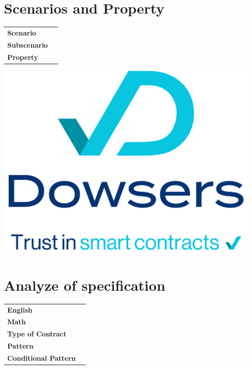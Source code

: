 \documentclass[a4paper,10pt]{article}
\newcommand{\pattern}{}
\newcommand{\conditionalPattern}{}
\newcommand{\specificationEN}{}
\newcommand{\specificationMATH}{}
\newcommand{\contractType}{}
\newcommand{\scenario}{}
\newcommand{\subScenario}{}
\newcommand{\property}{}
\begin{document}
\section{Scenarios and Property}
\begin{tabular}{p{} p{}}
\textbf{Scenario}               & \scenario \\
\vspace{0,05cm}
\textbf{Subscenario}            & \subScenario \\
\vspace{0,05cm}
\textbf{Property}               & \property \\
\end{tabular}
\bigskip

\newpage

\begin{center}
  \includegraphics[width=0.5\linewidth]{./images/dowsers_logo_signature.png}
\end{center}

\vspace{1cm}

\section{Analyze of specification}
\begin{tabular}{p{} p{}}
\textbf{English}                & \specificationEN \\
\vspace{0,05cm}
\textbf{Math}                   & \specificationMATH \\
\vspace{0,05cm}
\textbf{Type of Contract}       & \contractType \\
\vspace{0,05cm}
\textbf{Pattern}                & \pattern \\
\vspace{0,05cm}
\textbf{Conditional Pattern}    & \conditionalPattern \\
\end{tabular}
\bigskip
\end{document}
